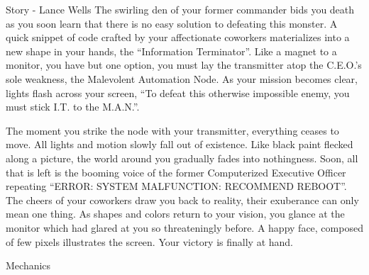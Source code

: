 \documentclass[12pt]{report}
\begin{document}
\begin{section}{Story - Lance Wells}
The swirling den of your former commander bids you death as you soon learn that there is no 
easy solution to defeating this monster. A quick snippet of code crafted by your affectionate 
coworkers materializes into a new shape in your hands, the ``Information Terminator''. Like a 
magnet to a monitor, you have but one option, you must lay the transmitter atop the C.E.O.'s 
sole weakness, the Malevolent Automation Node. As your mission becomes clear, lights flash across 
your screen, ``To defeat this otherwise impossible enemy, you must stick I.T. to the M.A.N.''.

The moment you strike the node with your transmitter, everything ceases to move. All lights and 
motion slowly fall out of existence. Like black paint flecked along a picture, the world around 
you gradually fades into nothingness. Soon, all that is left is the booming voice of the former 
Computerized Executive Officer repeating ``ERROR: SYSTEM MALFUNCTION: RECOMMEND REBOOT''. The 
cheers of your coworkers draw you back to reality, their exuberance can only mean one thing. As 
shapes and colors return to your vision, you glance at the monitor which had glared at you so 
threateningly before. A happy face, composed of few pixels illustrates the screen. Your victory 
is finally at hand.

\end{section}

\begin{section}{Mechanics}
\end{section}
\end{document}
